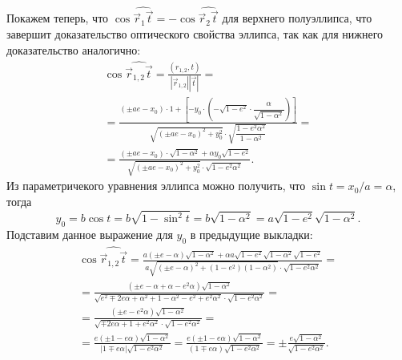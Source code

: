 Покажем теперь, что $\cos \widehat{\vec r_1 \vec t} = - \cos \widehat{\vec r_2 \vec t}$ для верхнего полуэллипса, что завершит доказательство оптического свойства эллипса, так как для нижнего доказательство аналогично:
\begin{multline*}
	\cos \widehat{\vec r_{1, 2}  \vec t}
	= \frac{(r_{1, 2}, t)}{|\vec r_{1, 2}| | \vec t|} = \\
	= \frac{(\pm ae - x_0) \cdot 1 + \left[ -y_0 \cdot \left(- \sqrt{1 - e^2} \cdot \dfrac{\alpha}{\sqrt{1 - \alpha^2}} \right) \right]}{\sqrt{(\pm ae - x_0)^2 + y_0^2} \cdot \sqrt{\dfrac{1 - e^2 \alpha^2}{1 - \alpha^2}}} =\\
	= \frac{(\pm ae - x_0) \cdot \sqrt{1 - \alpha^2} + \alpha y_0\sqrt{1 - e^2}}{\sqrt{(\pm ae - x_0)^2 + y_0^2} \cdot \sqrt{1 - e^2 \alpha^2}}.
\end{multline*}
Из параметричекого уравнения эллипса можно получить, что $\sin t = x_0/a = \alpha$, тогда
\begin{equation*}
	y_0 = b \cos t = b \sqrt{1 - \sin^2 t} = b \sqrt{1 - \alpha^2} = a \sqrt{1 - e^2} \sqrt{1 - \alpha^2}.
\end{equation*}
Подставим данное выражение для $y_0$ в предыдущие выкладки:
\begin{multline*}
	\cos \widehat{\vec r_{1, 2}  \vec t}
	= \frac{a ( \pm e - \alpha) \sqrt{1 - \alpha^2} + \alpha a \sqrt{1 - e^2} \sqrt{1 - \alpha^2} \sqrt{1 - e^2}}{a \sqrt{(\pm e - \alpha)^2 + (1 - e^2)(1 - \alpha^2)} \cdot \sqrt{1 - e^2 \alpha^2}} = \\
	= \frac{ (\pm e - \alpha + \alpha - e^2 \alpha) \sqrt{1 - \alpha^2}}{\sqrt{e^2 \mp 2 e\alpha + \alpha^2 + 1 - \alpha^2 - e^2 + e^2 \alpha^2} \cdot \sqrt{1 - e^2 \alpha^2}} = \\
	= \frac{ (\pm e - e^2 \alpha) \sqrt{1 - \alpha^2}}{\sqrt{\mp 2 e\alpha + 1  + e^2 \alpha^2} \cdot \sqrt{1 - e^2 \alpha^2}} = \\
	= \frac{ e(\pm 1 - e \alpha) \sqrt{1 - \alpha^2}}{|1 \mp e\alpha| \sqrt{1 - e^2 \alpha^2}}
	= \frac{ e(\pm 1 - e \alpha) \sqrt{1 - \alpha^2}}{(1 \mp e\alpha) \sqrt{1 - e^2 \alpha^2}}
	= \pm \frac{e \sqrt{1 - \alpha^2}}{\sqrt{1 - e^2 \alpha^2}}.
\end{multline*}

